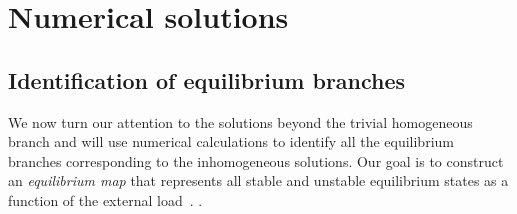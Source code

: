 \documentclass[10pt]{article}
\begin{document}
%
%

\section{Numerical solutions}
\label{sec:numerics}
\subsection{Identification of equilibrium branches}

%
We now turn our attention to the solutions beyond the trivial homogeneous branch and will use numerical calculations to identify all the equilibrium branches corresponding to the inhomogeneous solutions. Our goal is to construct an \emph{equilibrium map} that represents all stable and unstable equilibrium states as a function of the external load~\cite{Pattamatta2014-pn}.
.
\end{document}
